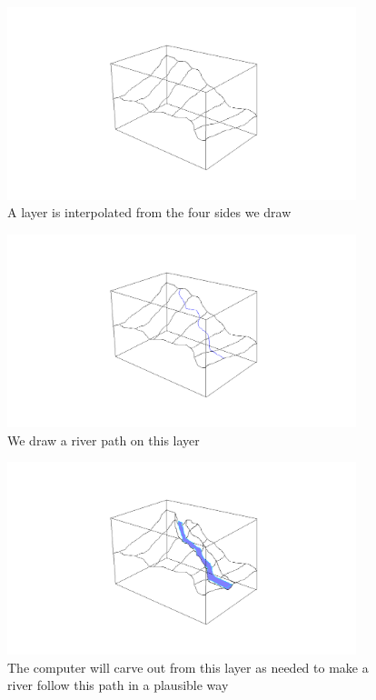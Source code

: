 \documentclass[12pt,a4paper]{article}
\begin{document}
\begin{figure}
\centering
\includegraphics[width=4in]{interpolateLayer}
\caption[]{
  \footnotesize
  A layer is interpolated from the four sides we draw
  \label{fig:interpolateLayer}
}
\end{figure}

\begin{figure}
\centering
\includegraphics[width=4in]{drawRiver}
\caption[]{
  \footnotesize
  We draw a river path on this layer
  \label{fig:drawRiver}
}
\end{figure}

\begin{figure}
\centering
\includegraphics[width=4in]{carveRiver}
\caption[]{
  \footnotesize
  The computer will carve out from this layer as needed to make a river follow this path in a plausible way
  \label{fig:carveRiver}
}
\end{figure}
\end{document}
